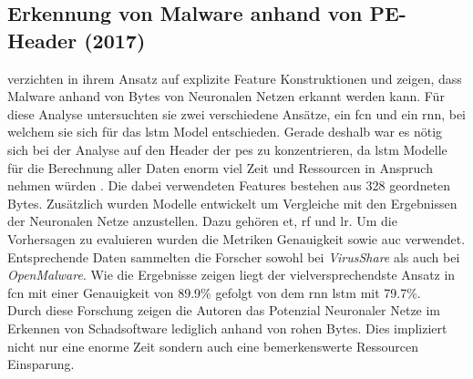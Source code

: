 \documentclass[
    12pt, %
    DIV10,
    ngerman, %
    a4paper, %
    oneside, %
    titlepage, %
    parskip=half, %
    headings=normal, %
    listof=totoc, %
    bibliography=totoc, %
    index=totoc, %
    captions=tableheading, %
    final %
]{scrreprt}
\begin{document}
\subsection{Erkennung von Malware anhand von PE-Header (2017)}
\textcite{Raff2017} verzichten in ihrem Ansatz auf explizite Feature Konstruktionen und zeigen, dass Malware anhand von Bytes von Neuronalen Netzen erkannt werden kann. 
Für diese Analyse untersuchten sie zwei verschiedene Ansätze, ein \ac{fcn} und ein \ac{rnn}, bei welchem sie sich für das \ac{lstm} Model entschieden. Gerade deshalb war es nötig sich bei der Analyse auf den Header der \ac{pes} zu konzentrieren, da \ac{lstm} Modelle für die Berechnung aller Daten enorm viel Zeit und Ressourcen in Anspruch nehmen würden \parencite{Raff2017}. Die dabei verwendeten Features bestehen aus 328 geordneten Bytes.
Zusätzlich wurden Modelle entwickelt um Vergleiche mit den Ergebnissen der Neuronalen Netze anzustellen. Dazu gehören \ac{et}, \ac{rf} und \ac{lr}. Um die Vorhersagen zu evaluieren wurden die Metriken Genauigkeit sowie \ac{auc} verwendet. Entsprechende Daten sammelten die Forscher sowohl bei \emph{VirusShare} als auch bei \emph{OpenMalware}. Wie die Ergebnisse zeigen liegt der vielversprechendste Ansatz in \ac{fcn} mit einer Genauigkeit von 89.9\% gefolgt von dem \ac{rnn} \ac{lstm} mit 79.7\%.\\
Durch diese Forschung zeigen die Autoren das Potenzial Neuronaler Netze im Erkennen von Schadsoftware lediglich anhand von rohen Bytes. Dies impliziert nicht nur eine enorme Zeit sondern auch eine bemerkenswerte Ressourcen Einsparung.
%
\end{document}
